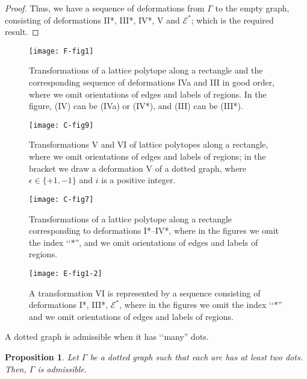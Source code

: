 \documentclass[a4paper,11pt]{amsart}
\numberwithin{equation}{section}
\newtheorem{proposition}[theorem]{Proposition}
\begin{document}
\begin{proof}
Thus, we have a sequence of deformations from $\Gamma$ to the empty graph, consisting of deformations II*, III*, IV*, V and $\mathcal{E}^*$; which is the required result. 
\end{proof}

\begin{figure}[ht]
\centering
\texttt{[image: F-fig1]}
\caption{Transformations of a lattice polytope along a rectangle   and the corresponding sequence of deformations IVa and III in good order, where we omit orientations of edges and labels of regions. In the figure, (IV) can be (IVa) or (IV*), and (III) can be (III*).}%
\label{F-fig1}
\end{figure}

\begin{figure}[ht]
\centering
\texttt{[image: C-fig9]}
\caption{Transformations V and VI of lattice polytopes along a rectangle, where we omit orientations of edges and labels of regions; in the bracket we draw a deformation V of a dotted graph, where $\epsilon \in \{+1, -1\}$ and $i$ is a positive integer. }%
\label{C-fig9}
\end{figure}




\begin{figure}[ht]
\centering
\texttt{[image: C-fig7]}
\caption{Transformations of a lattice polytope along a rectangle corresponding to deformations I*--IV*, where in the figures we omit the index \lq\lq $*$'', and we omit orientations of edges and labels of regions.}%
\label{B-fig17}
\end{figure}



\begin{figure}[ht]
\centering
\texttt{[image: E-fig1-2]}
\caption{A transformation VI is represented by a sequence consisting of deformations I*, III*, $\mathcal{E}^*$, where in the figures we omit the index \lq\lq $*$'' and we omit orientations of edges and labels of regions. }%
\label{B-fig18}
\end{figure}


 
A dotted graph is admissible when it has \lq\lq many'' dots. 

\begin{proposition}\label{prop3-8}
Let $\Gamma$ be a dotted graph such that each arc has at least two dots. Then, $\Gamma$ is admissible. 
\end{proposition}
\end{document}
